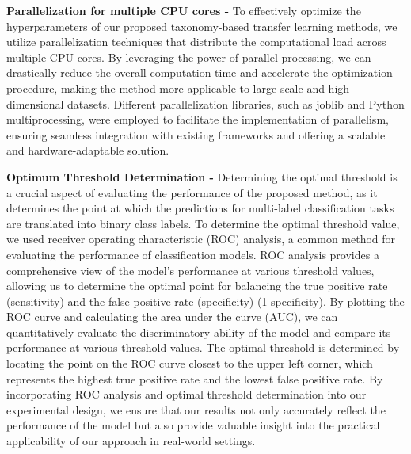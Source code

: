 \textbf{Parallelization for multiple CPU cores - } To effectively optimize the hyperparameters of our proposed taxonomy-based transfer learning methods, we utilize parallelization techniques that distribute the computational load across multiple CPU cores. By leveraging the power of parallel processing, we can drastically reduce the overall computation time and accelerate the optimization procedure, making the method more applicable to large-scale and high-dimensional datasets. Different parallelization libraries, such as joblib and Python multiprocessing, were employed to facilitate the implementation of parallelism, ensuring seamless integration with existing frameworks and offering a scalable and hardware-adaptable solution.

\textbf{Optimum Threshold Determination - } Determining the optimal threshold is a crucial aspect of evaluating the performance of the proposed method, as it determines the point at which the predictions for multi-label classification tasks are translated into binary class labels. To determine the optimal threshold value, we used receiver operating characteristic (ROC) analysis, a common method for evaluating the performance of classification models. ROC analysis provides a comprehensive view of the model's performance at various threshold values, allowing us to determine the optimal point for balancing the true positive rate (sensitivity) and the false positive rate (specificity) (1-specificity). By plotting the ROC curve and calculating the area under the curve (AUC), we can quantitatively evaluate the discriminatory ability of the model and compare its performance at various threshold values. The optimal threshold is determined by locating the point on the ROC curve closest to the upper left corner, which represents the highest true positive rate and the lowest false positive rate. By incorporating ROC analysis and optimal threshold determination into our experimental design, we ensure that our results not only accurately reflect the performance of the model but also provide valuable insight into the practical applicability of our approach in real-world settings.


